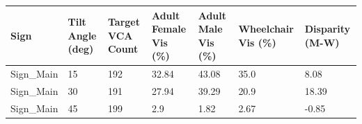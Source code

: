 \begin{tabular}{lllllll}
\hline
Sign & Tilt Angle (deg) & Target VCA Count & Adult Female Vis (\%) & Adult Male Vis (\%) & Wheelchair Vis (\%) & Disparity (M-W) \\ \hline
Sign\_Main & 15 & 192 & 32.84 & 43.08 & 35.0 & 8.08 \\
Sign\_Main & 30 & 191 & 27.94 & 39.29 & 20.9 & 18.39 \\
Sign\_Main & 45 & 199 & 2.9 & 1.82 & 2.67 & -0.85 \\
\hline
\end{tabular}
